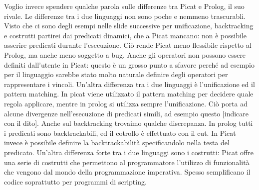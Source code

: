 \documentclass[11pt]{article}
\begin{document}
Voglio invece spendere qualche parola sulle differenze tra Picat e
Prolog, il suo rivale. Le differenze tra i due linguaggi non sono
poche e nemmeno trascurabli. Visto che ci sono degli esempi nelle
slide successive per unificazione, backtracking e costrutti partirei
dai predicati dinamici, che a Picat mancano: non è possibile asserire
predicati durante l'esecuzione. Ciò rende Picat meno flessibile
rispetto al Prolog, ma anche meno soggetto a bug. Anche gli operatori
non possono essere definiti dall'utente in Picat: questo è un grosso
punto a sfavore perché ad esempio per il linguaggio \lset{} sarebbe
stato molto naturale definire degli operatori per rappresentare i
vincoli. Un'altra differenza tra i due linguaggi è l'unificazione ed
il pattern matching. In picat viene utilizzato il pattern matching per
decidere quale regola applicare, mentre in prolog si utilizza sempre
l'unificazione. Ciò porta ad alcune divergenze nell'esecuzione di
predicati simili, ad esempio questo [indicare con il dito]. Anche sul
backtracking trovaimo qualche discrepanza. In prolog tutti i predicati
sono backtrackabili, ed il cotrollo è effettuato con il cut. In Picat
invece è possibile definire la backtrackabilità specificandolo nella
testa del predicato. Un'altra differenza forte tra i due linguaggi
sono i costrutti: Picat offre una serie di costrutti che permettono al
programmatore l'utilizzo di funzionalità che vengono dal mondo della
programmazione imperativa. Spesso semplificano il codice soprattutto
per programmi di scripting.
\end{document}

